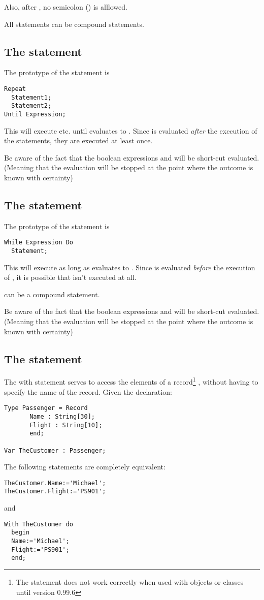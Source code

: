 \documentclass{report}
\begin{document}
Also, after , no semicolon (\var{;}) is alllowed.

All statements can be compound statements.
\subsection{The  statement}
The prototype of the  statement is
\begin{verbatim}
Repeat
  Statement1;
  Statement2;
Until Expression;
\end{verbatim}
This will execute  etc. until  evaluates to
. Since  is evaluated {\em after} the execution of the
statements, they are executed at least once.

Be aware of the fact that the boolean expressions  and
 will be short-cut evaluated. (Meaning that the evaluation
will be stopped at the point where the outcome is known with certainty)

\subsection{The  statement}
The prototype of the  statement is
\begin{verbatim}
While Expression Do
  Statement;
\end{verbatim}
This will execute  as long as  evaluates to
. Since  is evaluated {\em before} the execution
of , it is possible that  isn't executed at
all.

 can be a compound statement.

Be aware of the fact that the boolean expressions  and
 will be short-cut evaluated. (Meaning that the evaluation
will be stopped at the point where the outcome is known with certainty)

\subsection{The  statement}

The with statement serves to access the elements of a record\footnote{
The  statement does not work correctly when used with 
objects or classes until version 0.99.6}
, without
having to specify the name of the record. Given the declaration:
\begin{verbatim}
Type Passenger = Record
       Name : String[30];
       Flight : String[10];
       end;

Var TheCustomer : Passenger;
\end{verbatim}
The following statements are completely equivalent:
\begin{verbatim}
TheCustomer.Name:='Michael';
TheCustomer.Flight:='PS901';
\end{verbatim}
and
\begin{verbatim}
With TheCustomer do
  begin
  Name:='Michael';
  Flight:='PS901';
  end;
\end{verbatim}
\end{document}
